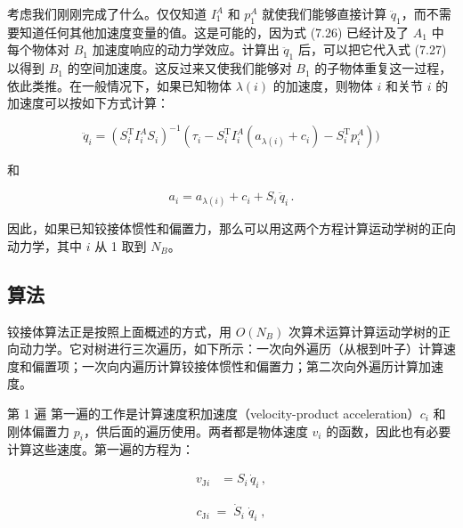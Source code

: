 \documentclass[10pt,a4paper]{book}
\theoremstyle{thmstyle} %
\theoremstyle{defstyle} %
\theoremstyle{prostyle} %
\begin{document}
考虑我们刚刚完成了什么。仅仅知道 $I_{1}^{A}$ 和 $p_{1}^{A}$ 就使我们能够直接计算 $\ddot{q}_{1}$，而不需要知道任何其他加速度变量的值。这是可能的，因为式 (7.26) 已经计及了 $A_{1}$ 中每个物体对 $B_{1}$ 加速度响应的动力学效应。计算出 $\ddot{q}_{1}$ 后，可以把它代入式 (7.27) 以得到 $B_{1}$ 的空间加速度。这反过来又使我们能够对 $B_{1}$ 的子物体重复这一过程，依此类推。在一般情况下，如果已知物体 $\lambda(i)$ 的加速度，则物体 $i$ 和关节 $i$ 的加速度可以按如下方式计算：



$$
\ddot { q } _ { i } = ( S _ { i } ^{\mathrm { T} } I _ { i } ^{A} S _ { i } ) ^{- 1} ( \tau _ { i } - S _ { i } ^{\mathrm { T} } I _ { i } ^{A} ( a _ { \lambda ( i ) } + c _ { i } ) - S _ { i } ^{\mathrm { T} } p _ { i } ^{A} ) )
$$



和



$$
a _ { i } = a _ { \lambda ( i ) } + c _ { i } + S _ { i } \, \ddot { q } _ { i } \, .
$$



因此，如果已知铰接体惯性和偏置力，那么可以用这两个方程计算运动学树的正向动力学，其中 $i$ 从 1 取到 $N_{B}$。



\subsection{算法}





铰接体算法正是按照上面概述的方式，用 $O(N_B)$ 次算术运算计算运动学树的正向动力学。它对树进行三次遍历，如下所示：一次向外遍历（从根到叶子）计算速度和偏置项；一次向内遍历计算铰接体惯性和偏置力；第二次向外遍历计算加速度。



第 1 遍 第一遍的工作是计算速度积加速度（velocity-product acceleration）$c_{i}$ 和刚体偏置力 $p_{i}$，供后面的遍历使用。两者都是物体速度 $v_{i}$ 的函数，因此也有必要计算这些速度。第一遍的方程为：



$$
\begin{array}{rl} { v _ { \mathrm { J } i } } & { = S _ { i } \, \dot { q } _ { i } \, , } \end{array}
$$



$$
c _ { \mathrm { J } i } \; = \; \dot { S } _ { i } \; \dot { q } _ { i } \; ,
$$
\end{document}
